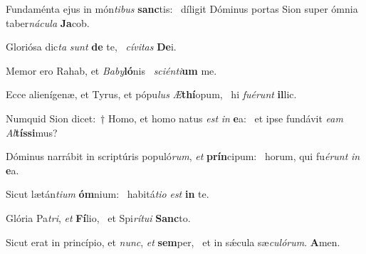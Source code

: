 \item Fundaménta ejus in món\textit{tibus} \textbf{sanc}tis:~\psstar{} díligit Dóminus portas Sion super ómnia taber\textit{nácula} \textbf{Ja}cob.
\item Gloriósa dic\textit{ta} \textit{sunt} \textbf{de} te,~\psstar{} \textit{cívitas} \textbf{De}i.
\item Memor ero Rahab, et \textit{Baby}\textbf{ló}nis~\psstar{} \textit{sciénti}\textbf{um} me.
\item Ecce alienígenæ, et Tyrus, et pópu\textit{lus} \textit{Æ}\textbf{thí}opum,~\psstar{} hi \textit{fuérunt} \textbf{il}lic.
\item Numquid Sion dicet:~† Homo, et homo natus \textit{est} \textit{in} \textbf{e}a:~\psstar{} et ipse fundávit \textit{eam} \textit{Al}\textbf{tís}\textbf{si}mus?
\item Dóminus narrábit in scriptúris populó\textit{rum}, \textit{et} \textbf{prín}cipum:~\psstar{} horum, qui fu\textit{érunt} \textit{in} \textbf{e}a.
\item Sicut lætán\textit{tium} \textbf{óm}nium:~\psstar{} habitá\textit{tio} \textit{est} \textbf{in} te.
\item Glória Pa\textit{tri}, \textit{et} \textbf{Fí}lio,~\psstar{} et Spi\textit{rítui} \textbf{Sanc}to.
\item Sicut erat in princípio, et \textit{nunc}, \textit{et} \textbf{sem}per,~\psstar{} et in sǽcula sæ\textit{culórum}. \textbf{A}men.
